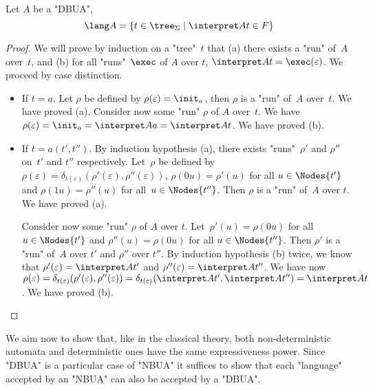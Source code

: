 \documentclass[a4paper,UKenglish,cleveref, autoref, thm-restate]{lipics-v2021}
\begin{document}
\begin{lemma}
	Let $A$ be a "DBUA",
	\[ \lang A = \setdef {t \in \tree_{\Sigma}} {\interpret A t \in F} \]
\end{lemma}

\begin{proof}
	We will prove by induction on a "tree"~$t$ that (a) there exists a "run" of~$A$ over~$t$, and (b) for all "runs"~$\exec$ of $A$ over $t$, $\interpret A t = \exec (\varepsilon)$.
	We proceed by case distinction.
	\begin{itemize}
		\item If $t = a$. Let $\rho$ be defined by $\rho(\varepsilon)=\init_a$, then $\rho$ is a "run" of~$A$ over~$t$. We have proved (a).
		      Consider now some "run" $\rho$ of $A$ over~$t$. We have $\rho(\varepsilon)=\init_a=\interpret A a=\interpret A t$. We have proved  (b).

		\item If $t = a(t',t'')$. By induction hypothesis (a), there exists "runs"~$\rho'$ and $\rho''$ on~$t'$ and $t''$ respectively.
		      Let~$\rho$ be defined by $\rho(\varepsilon)=\delta_{t(\varepsilon)}(\rho'(\varepsilon),\rho''(\varepsilon))$,
		      $\rho(0u)=\rho'(u)$ for all $u\in\Nodes{t'}$ and $\rho(1u)=\rho''(u)$ for all~$u\in \Nodes{t''}$. Then $\rho$ is a "run" of~$A$ over $t$. We have proved (a).

		      Consider now some "run" $\rho$ of $A$ over $t$. Let~$\rho'(u)=\rho(0u)$ for all $u \in \Nodes {t'}$ and $\rho''(u)=\rho(0u)$ for all $u \in \Nodes {t''}$.
		      Then $\rho'$ is a "run" of~$A$ over $t'$ and $\rho''$ over $t''$. By induction hypothesis (b) twice, we know that $\rho'(\varepsilon)=\interpret A {t'}$ and $\rho''(\varepsilon)=\interpret A {t''}$.
		      We have now $\rho(\varepsilon) = \delta_{t(\varepsilon)}(\rho'(\varepsilon),\rho''(\varepsilon)) = \delta_{t(\varepsilon)}(\interpret A {t'},\interpret A {t''}) = \interpret A t$. We have proved (b).
	\end{itemize}
\end{proof}


We aim now to show that, like in the classical theory, both non-deterministic automata and deterministic ones have the same expressiveness power.
Since "DBUA" is a particular case of "NBUA" it suffices to show that each "language" accepted by an "NBUA" can also be accepted by a "DBUA".
\end{document}
